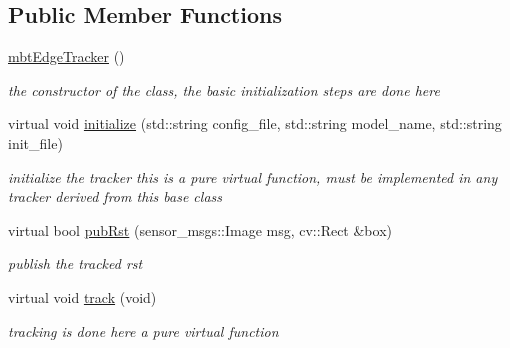 \subsection*{\-Public \-Member \-Functions}
\begin{DoxyCompactItemize}
\item 
\hypertarget{classmbtEdgeTracker_a5ced2da03b4450be9261485b8396a818}{\hyperlink{classmbtEdgeTracker_a5ced2da03b4450be9261485b8396a818}{mbt\-Edge\-Tracker} ()}\label{classmbtEdgeTracker_a5ced2da03b4450be9261485b8396a818}

\begin{DoxyCompactList}\small\item\em the constructor of the class, the basic initialization steps are done here \end{DoxyCompactList}\item 
\hypertarget{classmbtEdgeTracker_a538786bf1ac308a4d5d093c4cac0d649}{virtual void \hyperlink{classmbtEdgeTracker_a538786bf1ac308a4d5d093c4cac0d649}{initialize} (std\-::string config\-\_\-file, std\-::string model\-\_\-name, std\-::string init\-\_\-file)}\label{classmbtEdgeTracker_a538786bf1ac308a4d5d093c4cac0d649}

\begin{DoxyCompactList}\small\item\em initialize the tracker this is a pure virtual function, must be implemented in any tracker derived from this base class \end{DoxyCompactList}\item 
virtual bool \hyperlink{classmbtEdgeTracker_a2f85c97bd271cae8e6e32daa4d78a8cd}{pub\-Rst} (sensor\-\_\-msgs\-::\-Image msg, cv\-::\-Rect \&box)
\begin{DoxyCompactList}\small\item\em publish the tracked rst \end{DoxyCompactList}\item 
\hypertarget{classmbtEdgeTracker_a15ee6f543ab6e8cd3b24dcc51ff69405}{virtual void \hyperlink{classmbtEdgeTracker_a15ee6f543ab6e8cd3b24dcc51ff69405}{track} (void)}\label{classmbtEdgeTracker_a15ee6f543ab6e8cd3b24dcc51ff69405}

\begin{DoxyCompactList}\small\item\em tracking is done here a pure virtual function \end{DoxyCompactList}\end{DoxyCompactItemize}


